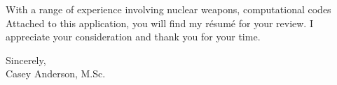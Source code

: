 \begin{center}
\begin{minipage}{\textwidth}
  \vspace{3mm}

  With a range of experience involving nuclear weapons, computational codes
  Attached to this application, you will find my r\'{e}sum\'{e} for your review. I appreciate your consideration and thank you for your time.
  
  \vspace{6mm}
  
  Sincerely, \\ 
  
  
  Casey Anderson, M.Sc.
  
  \end{minipage}
\end{center}

\vspace{2mm}

%

